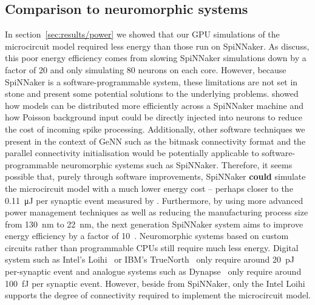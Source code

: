 \documentclass[utf8]{frontiersSCNS} %
\begin{document}
\subsection{Comparison to neuromorphic systems}
In section~\ref{sec:results/power} we showed that our GPU simulations of the microcircuit model required less energy than those run on SpiNNaker.
As \citet{VanAlbada2018} discuss, this poor energy efficiency comes from slowing SpiNNaker simulations down by a factor of \num{20} and only simulating \num{80} neurons on each core.
However, because SpiNNaker is a software-programmable system, these limitations are not set in stone and \citet{Knight2016b} present some potential solutions to the underlying problems.
\citet{Knight2016b} showed how models can be distributed more efficiently across a SpiNNaker machine and how Poisson background input could be directly injected into neurons to reduce the cost of incoming spike processing.
Additionally, other software techniques we present in the context of GeNN such as the bitmask connectivity format and the parallel connectivity initialisation would be potentially applicable to software-programmable neuromorphic systems such as SpiNNaker.
Therefore, it seems possible that, purely through software improvements, SpiNNaker \textbf{could} simulate the microcircuit model with a much lower energy cost -- perhaps closer to the \SI{0.11}{\micro\joule} per synaptic event measured by \citet{Sharp2012}.
Furthermore, by using more advanced power management techniques as well as reducing the manufacturing process size from \SI{130}{\nano\metre} to \SI{22}{\nano\meter}, the next generation SpiNNaker system aims to improve energy efficiency by a factor of \num{10}~\citep{Hoppner2017}.
Neuromorphic systems based on custom circuits rather than programmable CPUs still require much less energy.
Digital system such as Intel's Loihi~\citep{Davies2018} or IBM's TrueNorth~\citep{Merolla2014} only require around \SI{20}{\pico\joule} per-synaptic event and analogue systems such as Dynapse~\citep{Qiao2015} only require around \SI{100}{\femto\joule} per synaptic event.
However, beside from SpiNNaker, only the Intel Loihi supports the degree of connectivity required to implement the microcircuit model.
\end{document}
